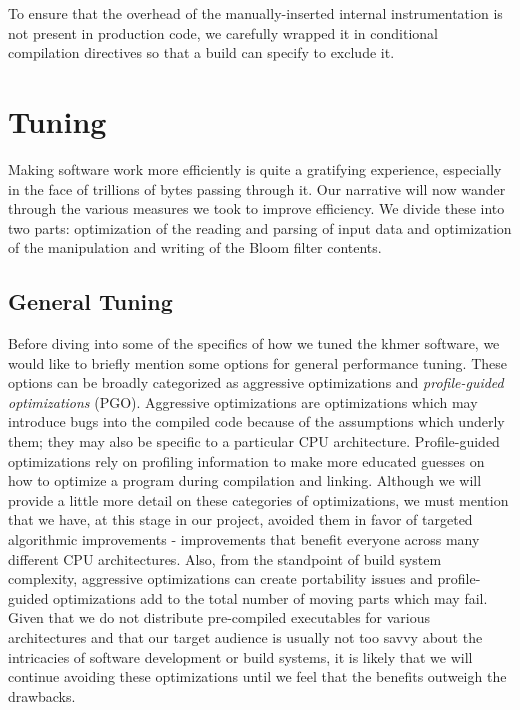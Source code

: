 \documentclass{article}
\begin{document}
To ensure that the overhead of the manually-inserted internal instrumentation is not present in production code, we carefully wrapped it in conditional compilation directives so that a build can specify to exclude it.

\section{Tuning}

Making software work more efficiently is quite a gratifying experience, especially in the face of trillions of bytes passing through it. Our narrative will now wander through the various measures we took to improve efficiency. We divide these into two parts: optimization of the reading and parsing of input data and optimization of the manipulation and writing of the Bloom filter contents.

\subsection{General Tuning}


Before diving into some of the specifics of how we tuned the khmer software, we would like to briefly mention some options for general performance tuning. These options can be broadly categorized as aggressive optimizations and \textit{profile-guided optimizations} (PGO). Aggressive optimizations are optimizations which may introduce bugs into the compiled code because of the assumptions which underly them; they may also be specific to a particular CPU architecture. Profile-guided optimizations rely on profiling information to make more educated guesses on how to optimize a program during compilation and linking. Although we will provide a little more detail on these categories of optimizations, we must mention that we have, at this stage in our project, avoided them in favor of targeted algorithmic improvements - improvements that benefit everyone across many different CPU architectures. Also, from the standpoint of build system complexity, aggressive optimizations can create portability issues and profile-guided optimizations add to the total number of moving parts which may fail. Given that we do not distribute pre-compiled executables for various architectures and that our target audience is usually not too savvy about the intricacies of software development or build systems, it is likely that we will continue avoiding these optimizations until we feel that the benefits outweigh the drawbacks.
\end{document}
